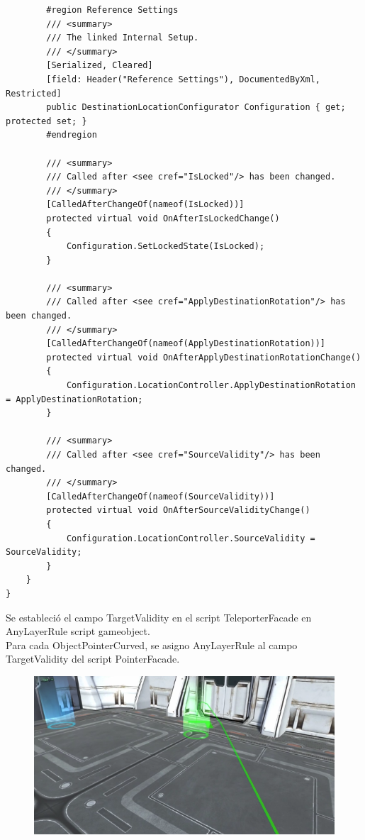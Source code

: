 \begin{verbatim}
        #region Reference Settings
        /// <summary>
        /// The linked Internal Setup.
        /// </summary>
        [Serialized, Cleared]
        [field: Header("Reference Settings"), DocumentedByXml, Restricted]
        public DestinationLocationConfigurator Configuration { get; protected set; }
        #endregion
 
        /// <summary>
        /// Called after <see cref="IsLocked"/> has been changed.
        /// </summary>
        [CalledAfterChangeOf(nameof(IsLocked))]
        protected virtual void OnAfterIsLockedChange()
        {
            Configuration.SetLockedState(IsLocked);
        }
 
        /// <summary>
        /// Called after <see cref="ApplyDestinationRotation"/> has been changed.
        /// </summary>
        [CalledAfterChangeOf(nameof(ApplyDestinationRotation))]
        protected virtual void OnAfterApplyDestinationRotationChange()
        {
            Configuration.LocationController.ApplyDestinationRotation = ApplyDestinationRotation;
        }
 
        /// <summary>
        /// Called after <see cref="SourceValidity"/> has been changed.
        /// </summary>
        [CalledAfterChangeOf(nameof(SourceValidity))]
        protected virtual void OnAfterSourceValidityChange()
        {
            Configuration.LocationController.SourceValidity = SourceValidity;
        }
    }
}
\end{verbatim}
Se estableció el campo TargetValidity en el script TeleporterFacade en AnyLayerRule script gameobject.\\

Para cada ObjectPointerCurved, se asigno AnyLayerRule al campo TargetValidity del script PointerFacade.\\
\begin{figure}[H]
	\begin{center}
 		\includegraphics[width = .5\textwidth]{source/images/image45.png}
	\end{center} 
\end{figure}

